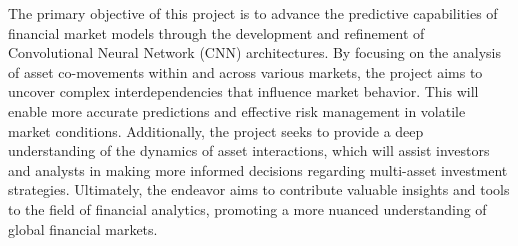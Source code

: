 \thesisspacing %

The primary objective of this project is to advance the predictive capabilities of financial market models through the development and refinement of Convolutional Neural Network (CNN) architectures. By focusing on the analysis of asset co-movements within and across various markets, the project aims to uncover complex interdependencies that influence market behavior. This will enable more accurate predictions and effective risk management in volatile market conditions. Additionally, the project seeks to provide a deep understanding of the dynamics of asset interactions, which will assist investors and analysts in making more informed decisions regarding multi-asset investment strategies. Ultimately, the endeavor aims to contribute valuable insights and tools to the field of financial analytics, promoting a more nuanced understanding of global financial markets.
